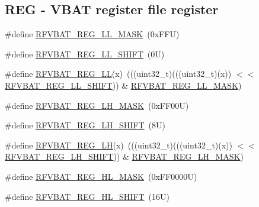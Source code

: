 \subsection*{R\+EG -\/ V\+B\+AT register file register}
\begin{DoxyCompactItemize}
\item 
\#define \mbox{\hyperlink{group___r_f_v_b_a_t___register___masks_gac055aaeebf0ff5200e7b3703d6a6ed73}{R\+F\+V\+B\+A\+T\+\_\+\+R\+E\+G\+\_\+\+L\+L\+\_\+\+M\+A\+SK}}~(0x\+F\+F\+U)
\item 
\#define \mbox{\hyperlink{group___r_f_v_b_a_t___register___masks_ga77fdef5edef0e9e20236761366ed3fbb}{R\+F\+V\+B\+A\+T\+\_\+\+R\+E\+G\+\_\+\+L\+L\+\_\+\+S\+H\+I\+FT}}~(0\+U)
\item 
\#define \mbox{\hyperlink{group___r_f_v_b_a_t___register___masks_ga0e8446d5980a8863f4d5f0be690e78a3}{R\+F\+V\+B\+A\+T\+\_\+\+R\+E\+G\+\_\+\+LL}}(x)~(((uint32\+\_\+t)(((uint32\+\_\+t)(x)) $<$$<$ \mbox{\hyperlink{group___r_f_v_b_a_t___register___masks_ga77fdef5edef0e9e20236761366ed3fbb}{R\+F\+V\+B\+A\+T\+\_\+\+R\+E\+G\+\_\+\+L\+L\+\_\+\+S\+H\+I\+FT}})) \& \mbox{\hyperlink{group___r_f_v_b_a_t___register___masks_gac055aaeebf0ff5200e7b3703d6a6ed73}{R\+F\+V\+B\+A\+T\+\_\+\+R\+E\+G\+\_\+\+L\+L\+\_\+\+M\+A\+SK}})
\item 
\#define \mbox{\hyperlink{group___r_f_v_b_a_t___register___masks_gaac2f9a56be08c02d917e25d2160bb25d}{R\+F\+V\+B\+A\+T\+\_\+\+R\+E\+G\+\_\+\+L\+H\+\_\+\+M\+A\+SK}}~(0x\+F\+F00\+U)
\item 
\#define \mbox{\hyperlink{group___r_f_v_b_a_t___register___masks_ga274af8b911ddd78c1ce6df899ad83cbd}{R\+F\+V\+B\+A\+T\+\_\+\+R\+E\+G\+\_\+\+L\+H\+\_\+\+S\+H\+I\+FT}}~(8\+U)
\item 
\#define \mbox{\hyperlink{group___r_f_v_b_a_t___register___masks_ga016bf338b7050742a030ffe81d9be9a4}{R\+F\+V\+B\+A\+T\+\_\+\+R\+E\+G\+\_\+\+LH}}(x)~(((uint32\+\_\+t)(((uint32\+\_\+t)(x)) $<$$<$ \mbox{\hyperlink{group___r_f_v_b_a_t___register___masks_ga274af8b911ddd78c1ce6df899ad83cbd}{R\+F\+V\+B\+A\+T\+\_\+\+R\+E\+G\+\_\+\+L\+H\+\_\+\+S\+H\+I\+FT}})) \& \mbox{\hyperlink{group___r_f_v_b_a_t___register___masks_gaac2f9a56be08c02d917e25d2160bb25d}{R\+F\+V\+B\+A\+T\+\_\+\+R\+E\+G\+\_\+\+L\+H\+\_\+\+M\+A\+SK}})
\item 
\#define \mbox{\hyperlink{group___r_f_v_b_a_t___register___masks_gae0f69a55f5feaf1e41b317aaa17780fe}{R\+F\+V\+B\+A\+T\+\_\+\+R\+E\+G\+\_\+\+H\+L\+\_\+\+M\+A\+SK}}~(0x\+F\+F0000\+U)
\item 
\#define \mbox{\hyperlink{group___r_f_v_b_a_t___register___masks_ga069a18ff685d5c1e8e48acc77454bf70}{R\+F\+V\+B\+A\+T\+\_\+\+R\+E\+G\+\_\+\+H\+L\+\_\+\+S\+H\+I\+FT}}~(16\+U)

\end{DoxyCompactItemize}
